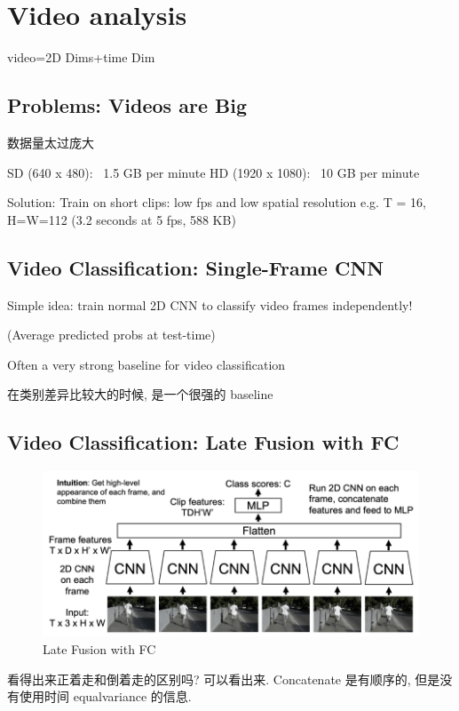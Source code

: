 \section{Video analysis}

video=2D Dims+time Dim


\subsection{Problems: Videos are Big}

数据量太过庞大

SD (640 x 480): ~1.5 GB per minute
HD (1920 x 1080): ~10 GB per minute

Solution: Train on short clips: low fps and low spatial resolution
e.g. T = 16, H=W=112 (3.2 seconds at 5 fps, 588 KB)

\subsection{Video Classification: Single-Frame CNN}

Simple idea: train normal 2D CNN to classify video frames independently!

(Average predicted probs at test-time)

Often a very strong baseline for video classification

在类别差异比较大的时候, 是一个很强的 baseline

\subsection{Video Classification: Late Fusion with FC}

\begin{figure}[htbp]
    \centering
    \includegraphics[scale=0.25]{figures/LF_FC.png}
    \caption{Late Fusion with FC}
\end{figure}

看得出来正着走和倒着走的区别吗? 可以看出来. Concatenate 是有顺序的, 但是没有使用时间 equalvariance 的信息.

